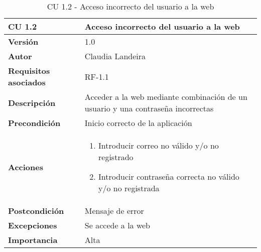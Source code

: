 \begin{table}[p]
	\centering
	\begin{tabularx}{\linewidth}{ p{} p{} }
		\toprule
		\textbf{CU 1.2}    & \textbf{Acceso incorrecto del usuario a la web}\\
		\toprule
		\textbf{Versión}              & 1.0    \\
		\textbf{Autor}                & Claudia Landeira \\
		\textbf{Requisitos asociados} & RF-1.1\\
		\textbf{Descripción}          & Acceder a la web mediante combinación de un usuario y una contraseña incorrectas\\
		\textbf{Precondición}         & Inicio correcto de la aplicación \\
		\textbf{Acciones}             &
		\begin{enumerate}
			\def\labelenumi{\arabic{enumi}.}
			\tightlist
			\item Introducir correo no válido y/o no registrado
			\item Introducir contraseña correcta no válido y/o no registrada
		\end{enumerate}\\
		\textbf{Postcondición}        & Mensaje de error \\
		\textbf{Excepciones}          & Se accede a la web \\
		\textbf{Importancia}          & Alta \\
		\bottomrule
	\end{tabularx}
	\caption{CU 1.2 - Acceso incorrecto del usuario a la web}
\end{table}

